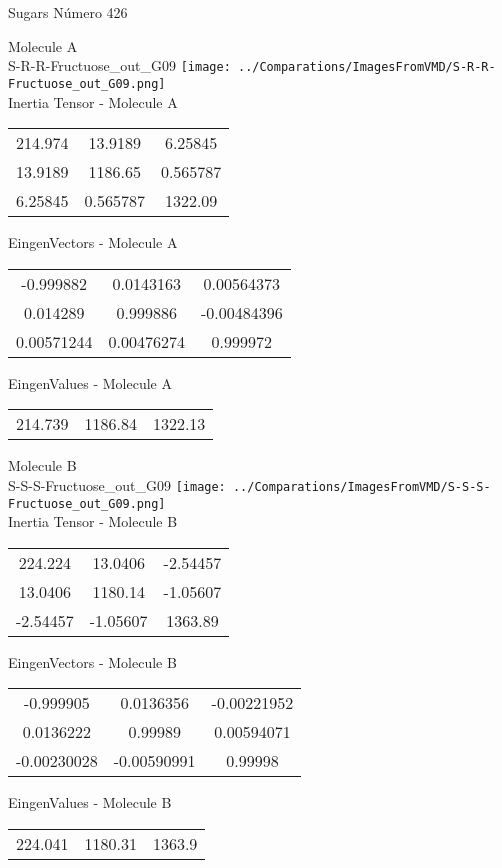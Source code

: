 \vtab[-2cm]
\begin{center}
{\large Sugars \tab Número 426}
\end{center}
\begin{multicols}{2}
\begin{center}

Molecule A \\ 
S-R-R-Fructuose\_out\_G09
\texttt{[image: ../Comparations/ImagesFromVMD/S-R-R-Fructuose\_out\_G09.png]}
\\
Inertia Tensor - Molecule A \\
\vtab

\begin{tabular}{|c c c|}
214.974	 & 	13.9189	 & 	6.25845	 \\
13.9189	 & 	1186.65	 & 	0.565787	 \\
6.25845	 & 	0.565787	 & 	1322.09
\end{tabular}

\vtab
 EingenVectors - Molecule A     \\
\vtab
\begin{tabular}{|c c c|}
-0.999882	 & 	0.0143163	 & 	0.00564373	 \\
0.014289	 & 	0.999886	 & 	-0.00484396	 \\
0.00571244	 & 	0.00476274	 & 	0.999972
\end{tabular}

\vtab
 EingenValues - Molecule A     \\
\vtab
\begin{tabular}{|c c c|}
214.739	 & 	1186.84	 & 	1322.13	 \\
\end{tabular}
\columnbreak

Molecule B \\ 
S-S-S-Fructuose\_out\_G09
\texttt{[image: ../Comparations/ImagesFromVMD/S-S-S-Fructuose\_out\_G09.png]}
\\
Inertia Tensor - Molecule B \\
\vtab

\begin{tabular}{|c c c|}
224.224	 & 	13.0406	 & 	-2.54457	 \\
13.0406	 & 	1180.14	 & 	-1.05607	 \\
-2.54457	 & 	-1.05607	 & 	1363.89
\end{tabular}

\vtab
 EingenVectors - Molecule B     \\
\vtab
\begin{tabular}{|c c c|}
-0.999905	 & 	0.0136356	 & 	-0.00221952	 \\
0.0136222	 & 	0.99989	 & 	0.00594071	 \\
-0.00230028	 & 	-0.00590991	 & 	0.99998
\end{tabular}

\vtab
 EingenValues - Molecule B     \\
\vtab
\begin{tabular}{|c c c|}
224.041	 & 	1180.31	 & 	1363.9	 \\
\end{tabular}

\end{center}
\end{multicols}
